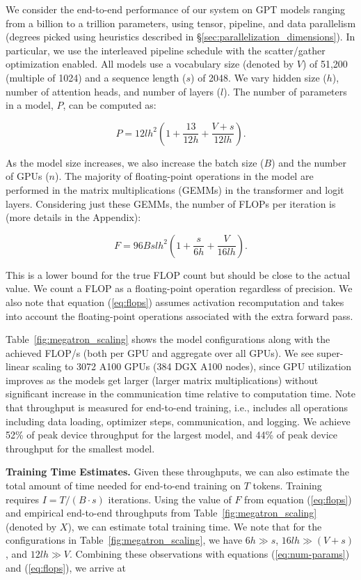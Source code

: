We consider the end-to-end performance of our system on GPT models ranging from a billion to a trillion parameters, using tensor, pipeline, and data parallelism (degrees picked using heuristics described in \S\ref{sec:parallelization_dimensions}). In particular, we use the interleaved pipeline schedule with the scatter/gather optimization enabled. All models use a vocabulary size (denoted by $V$) of 51,200 (multiple of 1024) and a sequence length ($s$) of 2048. We vary hidden size ($h$), number of attention heads, and number of layers ($l$). The number of parameters in a model, $P$, can be computed as:

\begin{equation}
  P = 12lh^2\left(1 + \dfrac{13}{12h}+\dfrac{V+s}{12lh}\right).
  \label{eq:num-params}
\end{equation}

As the model size increases, we also increase the batch size ($B$) and the number of GPUs ($n$). The majority of floating-point operations in the model are performed in the matrix multiplications (GEMMs) in the transformer and logit layers. Considering just these GEMMs, the number of FLOPs per iteration is (more details in the Appendix):

\begin{equation}
    F=96Bslh^2\left(1 + \dfrac{s}{6h} + \dfrac{V}{16lh}\right).
    \label{eq:flops}
\end{equation}

This is a lower bound for the true FLOP count but should be close to the actual value. We count a FLOP as a floating-point operation regardless of precision. We also note that equation (\ref{eq:flops}) assumes activation recomputation and takes into account the floating-point operations associated with the extra forward pass.

Table~\ref{fig:megatron_scaling} shows the model configurations along with the achieved FLOP/s (both per GPU and aggregate over all GPUs). We see super-linear scaling to 3072 A100 GPUs (384 DGX A100 nodes), since GPU utilization improves as the models get larger (larger matrix multiplications) without significant increase in the communication time relative to computation time. Note that throughput is measured for end-to-end training, i.e., includes all operations including data loading, optimizer steps, communication, and logging. We achieve 52\% of peak device throughput for the largest model, and 44\% of peak device throughput for the smallest model.

\textbf{Training Time Estimates.} Given these throughputs, we can also estimate the total amount of time needed for end-to-end training on $T$ tokens. Training requires $I=T/\left(B \cdot s\right)$ iterations. Using the value of $F$ from equation (\ref{eq:flops}) and empirical end-to-end throughputs from Table~\ref{fig:megatron_scaling} (denoted by $X$), we can estimate total training time. We note that for the configurations in Table~\ref{fig:megatron_scaling}, we have $6h \gg s$, $16lh \gg \left(V+s\right)$, and $12lh \gg V$. Combining these observations with equations (\ref{eq:num-params}) and  (\ref{eq:flops}), we arrive at

